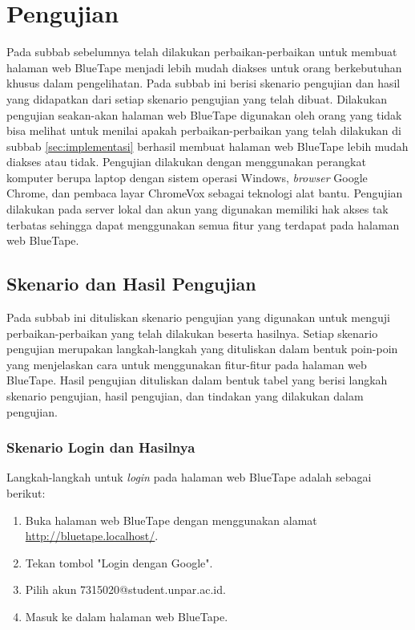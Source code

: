 \section{Pengujian}
\label{sec:pengujian}
Pada subbab sebelumnya telah dilakukan perbaikan-perbaikan untuk membuat halaman web BlueTape menjadi lebih mudah diakses untuk orang berkebutuhan khusus dalam pengelihatan. Pada subbab ini berisi skenario pengujian dan hasil yang didapatkan dari setiap skenario pengujian yang telah dibuat. Dilakukan pengujian seakan-akan halaman web BlueTape digunakan oleh orang yang tidak bisa melihat untuk menilai apakah perbaikan-perbaikan yang telah dilakukan di subbab \ref{sec:implementasi} berhasil membuat halaman web BlueTape lebih mudah diakses atau tidak. Pengujian dilakukan dengan menggunakan perangkat komputer berupa laptop dengan sistem operasi Windows, \textit{browser} Google Chrome, dan pembaca layar ChromeVox sebagai teknologi alat bantu. Pengujian dilakukan pada server lokal dan akun yang digunakan memiliki hak akses tak terbatas sehingga dapat menggunakan semua fitur yang terdapat pada halaman web BlueTape.

\subsection{Skenario dan Hasil Pengujian}
\label{subsec:skenario_dan_hasil_pengujian}
Pada subbab ini dituliskan skenario pengujian yang digunakan untuk menguji perbaikan-perbaikan yang telah dilakukan beserta hasilnya. Setiap skenario pengujian merupakan langkah-langkah yang dituliskan dalam bentuk poin-poin yang menjelaskan cara untuk menggunakan fitur-fitur pada halaman web BlueTape. Hasil pengujian dituliskan dalam bentuk tabel yang berisi langkah skenario pengujian, hasil pengujian, dan tindakan yang dilakukan dalam pengujian.

\subsubsection{Skenario Login dan Hasilnya}
\label{subsubsec:skenario_login}
Langkah-langkah untuk \textit{login} pada halaman web BlueTape adalah sebagai berikut:

\begin{enumerate}
    \item Buka halaman web BlueTape dengan menggunakan alamat \url{http://bluetape.localhost/}.
    \item Tekan tombol "Login dengan Google".
    \item Pilih akun 7315020@student.unpar.ac.id.
    \item Masuk ke dalam halaman web BlueTape.
\end{enumerate}

